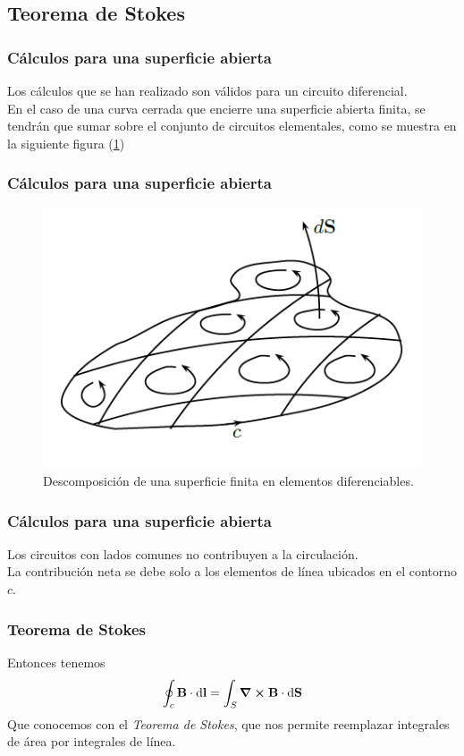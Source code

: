 \documentclass[12pt]{beamer}
\begin{document}
\subsection{Teorema de Stokes}
\begin{frame}
\frametitle{Cálculos para una superficie abierta}
Los cálculos que se han realizado son válidos para un circuito diferencial.
\\
\bigskip
En el caso de una curva cerrada que encierre una superficie abierta finita, se tendrán que sumar sobre el conjunto de circuitos elementales, como se muestra en la siguiente figura (\ref{fig:figura_superficie_elementos_diferenciables})
\end{frame}
\begin{frame}
\frametitle{Cálculos para una superficie abierta}
\begin{figure}[h!]
    \centering
    \includegraphics[scale=0.6]{Imagenes/Superficie_Elementos_Diferenciables.png}
    \caption{Descomposición de una superficie finita en elementos diferenciables.}
    \label{fig:figura_superficie_elementos_diferenciables}
\end{figure}
\end{frame}
\begin{frame}
\frametitle{Cálculos para una superficie abierta}
Los circuitos con lados comunes no contribuyen a la circulación.
\\
\bigskip
La contribución neta se debe solo a los elementos de línea ubicados en el contorno $c$.
\end{frame}
\begin{frame}
\frametitle{Teorema de Stokes}
Entonces tenemos
\begin{align}
\oint_{c} \vb{B} \cdot \dd{\vb{l}} = \int_{S} \curl{\vb{B}} \cdot \dd{\vb{S}}
\label{eq:ecuacion_01_35}
\end{align}
Que conocemos con el \emph{Teorema de Stokes}, que nos permite reemplazar integrales de área por integrales de línea.
\end{frame}
\end{document}
